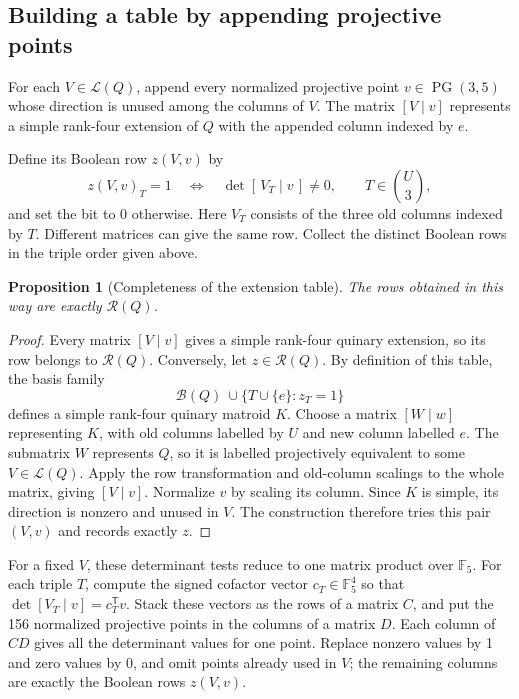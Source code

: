 \documentclass[11pt,a4paper]{article}
\newtheorem{proposition}[theorem]{Proposition}
\theoremstyle{definition}
\newcommand{\F}{\mathbb F_5}
\newcommand{\B}{\mathcal B}
\newcommand{\RR}{\mathcal R}
\newcommand{\PG}{\operatorname{PG}}
\begin{document}
\subsection{Building a table by appending projective points}

For each $V\in\mathcal L(Q)$, append every normalized projective
point $v\in\PG(3,5)$ whose direction is unused among the columns
of $V$. The matrix $[V\mid v]$ represents a simple rank-four
extension of $Q$ with the appended column indexed by $e$.

Define its Boolean row $z(V,v)$ by
\[
 z(V,v)_T=1\quad\Longleftrightarrow\quad
             \det[\,V_T\mid v\,]\ne0,
             \qquad T\in\binom U3,
\]
and set the bit to 0 otherwise. Here $V_T$ consists of the three
old columns indexed by $T$. Different matrices can give the same
row. Collect the distinct Boolean rows in the triple order given
above.

\begin{proposition}[Completeness of the extension table]\label{prop:tables}
The rows obtained in this way are exactly $\RR(Q)$.
\end{proposition}
\begin{proof}
Every matrix $[V\mid v]$ gives a simple rank-four quinary
extension, so its row belongs to $\RR(Q)$. Conversely, let
$z\in\RR(Q)$. By definition of this table, the basis family
\[
 \B(Q)\ \cup\{T\cup\{e\}:z_T=1\}
\]
defines a simple rank-four quinary matroid $K$. Choose a matrix
$[W\mid w]$ representing $K$, with old columns labelled by $U$
and new column labelled $e$. The submatrix $W$ represents $Q$, so
it is labelled projectively equivalent to some $V\in\mathcal L(Q)$.
Apply the row transformation and old-column scalings to the whole
matrix, giving $[V\mid v]$. Normalize $v$ by scaling its column.
Since $K$ is simple, its direction is nonzero and unused in $V$.
The construction therefore tries this pair $(V,v)$ and records
exactly $z$.
\end{proof}

For a fixed $V$, these determinant tests reduce to one matrix
product over $\F$. For each triple $T$, compute the signed
cofactor vector $c_T\in\F^4$ so that
$\det[V_T\mid v]=c_T^{\mathsf T}v$. Stack these vectors as the
rows of a matrix $C$, and put the 156 normalized projective points
in the columns of a matrix $D$. Each column of $CD$ gives all
the determinant values for one point. Replace nonzero values by
1 and zero values by 0, and omit points already used in $V$;
the remaining columns are exactly the Boolean rows $z(V,v)$.
\end{document}
